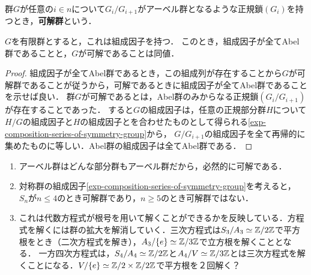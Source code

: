 \documentclass[uplatex,dvipdfmx]{jsreport}
\begin{document}
\begin{definition}
    群$G$が任意の$i\in n$について$G_i/G_{i+1}$がアーベル群となるような正規鎖$(G_i)$を持つとき，\textbf{可解群}という．
\end{definition}

\begin{lemma}[組成因子による可解性の特徴付け]
    $G$を有限群とすると，これは組成因子を持つ．
    このとき，組成因子が全てAbel群であることと，$G$が可解であることは同値．
\end{lemma}
\begin{proof}
    組成因子が全てAbel群であるとき，この組成列が存在することから$G$が可解群であることが従うから，可解であるときに組成因子が全てAbel群であることを示せば良い．
    群$G$が可解であるとは，Abel群のみからなる正規鎖$(G_i/G_{i+1})$が存在することであった．
    すると$G$の組成因子は，任意の正規部分群$H$について$H/G$の組成因子と$H$の組成因子とを合わせたものとして得られる\ref{exp-composition-series-of-symmetry-group}から，
    $G/G_{i+1}$の組成因子を全て再帰的に集めたものに等しい．Abel群の組成因子は全てAbel群である．
\end{proof}
\begin{example}\mbox{}\label{exp-solvable-groups}
    \begin{enumerate}
        \item アーベル群はどんな部分群もアーベル群だから，必然的に可解である．
        \item 対称群の組成因子\ref{exp-composition-series-of-symmetry-group}を考えると，
        $S_n$が$n\le 4$のとき可解群であり，$n\ge 5$のとき可解群ではない．
        \item これは代数方程式が根号を用いて解くことができるかを反映している．方程式を解くには群の拡大を解消していく．三次方程式は$S_3/A_3\simeq\mathbb{Z}/2\mathbb{Z}$で平方根をとき（二次方程式を解き），$A_3/\{e\}\simeq\mathbb{Z}/3\mathbb{Z}$で立方根を解くこととなる．
        一方四次方程式は，$S_4/A_4\simeq\mathbb{Z}/2\mathbb{Z}$と$A_4/V\simeq\mathbb{Z}/3\mathbb{Z}$とは三次方程式を解くことになる．$V/\{e\}\simeq\mathbb{Z}/2\times\mathbb{Z}/2\mathbb{Z}$で平方根を２回解く？
    \end{enumerate}
\end{example}
\end{document}
